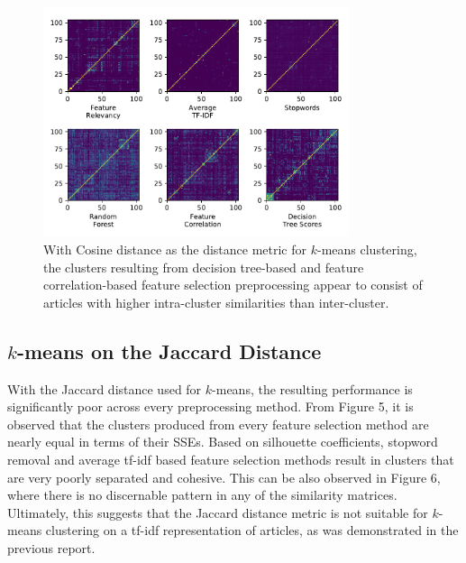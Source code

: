 \documentclass[11pt]{article}
\begin{document}
\begin{figure}[h!] \label{fig:something}
  \centering
  \includegraphics[width=0.8\textwidth]{figures/hw3/cosine/similarity_matrices}
  \caption{With Cosine distance as the distance metric for $k$-means clustering, the clusters resulting from decision tree-based and feature correlation-based feature selection preprocessing appear to consist of articles with higher intra-cluster similarities than inter-cluster.}
\end{figure}


\subsection{$k$-means on the Jaccard Distance} \label{sec:jaccard}

With the Jaccard distance used for $k$-means, the resulting performance is significantly poor across every preprocessing method.
From Figure 5, it is observed that the clusters produced from every feature selection method are nearly equal in terms of their SSEs.
Based on silhouette coefficients, stopword removal and average tf-idf based feature selection methods result in clusters that are very poorly separated and cohesive.
This can be also observed in Figure 6, where there is no discernable pattern in any of the similarity matrices.
Ultimately, this suggests that the Jaccard distance metric is not suitable for $k$-means clustering on a tf-idf representation of articles, as was demonstrated in the previous report.
\end{document}
